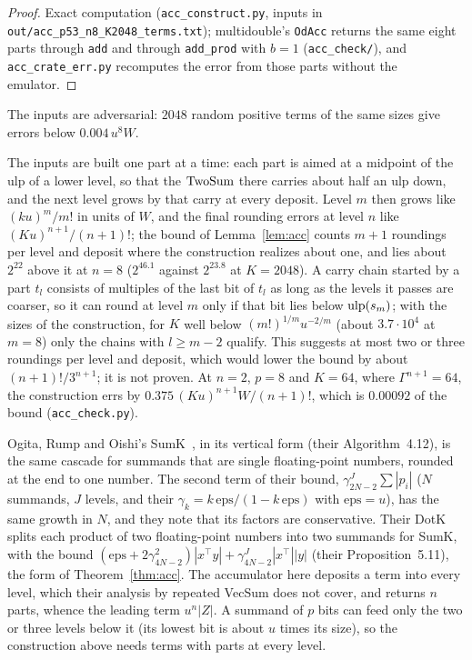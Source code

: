 \begin{proof}
Exact computation (\texttt{acc\_construct.py}, inputs in \texttt{out/acc\_p53\_n8\_K2048\_terms.txt}); multidouble's
\texttt{OdAcc} returns the same eight parts through \texttt{add} and through \texttt{add\_prod} with $b = 1$
(\texttt{acc\_check/}), and \texttt{acc\_crate\_err.py} recomputes the error from those parts without the emulator.
\end{proof}

The inputs are adversarial: $2048$ random positive terms of the same sizes give errors below $0.004\,u^8W$.

\begin{remark}
The inputs are built one part at a time: each part is aimed at a midpoint of the ulp of a lower level, so that the
$\mathrm{TwoSum}$ there carries about half an ulp down, and the next level grows by that carry at every deposit. Level $m$
then grows like $(ku)^m/m!$ in units of $W$, and the final rounding errors at level $n$ like $(Ku)^{n+1}/(n+1)!$; the
bound of Lemma~\ref{lem:acc} counts $m+1$ roundings per level and deposit where the construction realizes about one, and
lies about $2^{22}$ above it at $n = 8$ ($2^{46.1}$ against $2^{23.8}$ at $K = 2048$). A carry chain started by a part $t_l$ consists of multiples of
the last bit of $t_l$ as long as the levels it passes are coarser, so it can round at level $m$ only if that bit lies
below $\mathrm{ulp}(s_m)$; with the sizes of the construction, for $K$ well below $(m!)^{1/m}u^{-2/m}$ (about $3.7 \cdot 10^4$ at $m = 8$) only the chains with $l \ge m - 2$
qualify. This suggests at most two
or three roundings per level and deposit, which would lower the bound by about $(n+1)!/3^{n+1}$; it is not proven. At
$n = 2$, $p = 8$ and $K = 64$, where $\Gamma^{n+1} = 64$, the construction errs by $0.375\,(Ku)^{n+1}W/(n+1)!$, which
is $0.00092$ of the bound (\texttt{acc\_check.py}).

Ogita, Rump and Oishi's SumK~\cite{ORO05}, in its vertical form (their Algorithm~4.12), is the same cascade for summands
that are single floating-point numbers, rounded at the end to one number. The second term of their bound, $\gamma_{2N-2}^{J}\sum|p_i|$
($N$ summands, $J$ levels, and their $\gamma_k = k\,\mathrm{eps}/(1 - k\,\mathrm{eps})$ with $\mathrm{eps} = u$), has the same growth in $N$, and they note that its factors are conservative. Their DotK
splits each product of two floating-point numbers into two summands for SumK, with the bound $(\mathrm{eps} +
2\gamma_{4N-2}^2)|x^\top y| + \gamma_{4N-2}^J|x^\top||y|$ (their Proposition~5.11), the form of Theorem~\ref{thm:acc}. The
accumulator here deposits a term into every level, which their analysis by repeated VecSum does not cover, and returns
$n$ parts, whence the leading term $u^n|Z|$. A summand of $p$ bits can feed only the two or three levels below it
(its lowest bit is about $u$ times its size), so the construction above needs terms with parts at every level.


\end{remark}
